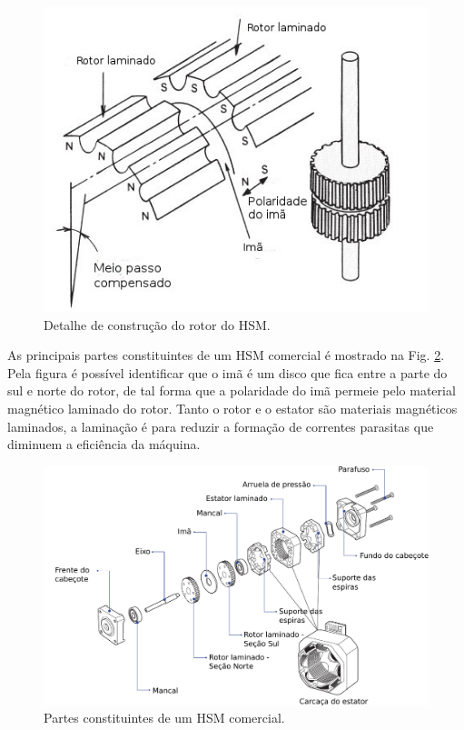 \begin{figure}[!h]
	\centering
	\includegraphics[width = \columnwidth]{Images/VR_ROTOR.jpg}
	\caption{Detalhe de construção do rotor do HSM. \cite{angulo_rotor}}
	\label{fig:HSM_dentes}
\end{figure}

As principais partes constituintes de um HSM comercial é mostrado na Fig. \ref{fig:partes_SM}. Pela figura é possível identificar que o imã é um disco que fica entre a parte do sul e norte do rotor, de tal forma que a polaridade do imã permeie pelo material magnético laminado do rotor. Tanto o rotor e o estator são materiais magnéticos laminados, a laminação é para reduzir a formação de correntes parasitas que diminuem a eficiência da máquina.

\begin{figure}[!t]
	\centering
	\includegraphics[width = .8\textwidth]{Images/partes_HSM.pdf}
	\caption{Partes constituintes de um HSM comercial. \cite{MoonsHSM}}
	\label{fig:partes_SM}
\end{figure}
